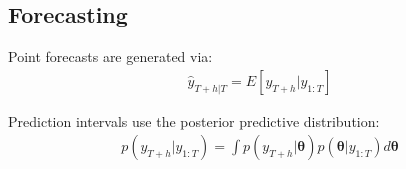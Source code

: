\subsection{Forecasting}

Point forecasts are generated via:
\begin{align}
    \hat{y}_{T+h|T} = E[y_{T+h} | y_{1:T}]
\end{align}

Prediction intervals use the posterior predictive distribution:
\begin{align}
    p(y_{T+h} | y_{1:T}) = \int p(y_{T+h} | \boldsymbol{\theta}) p(\boldsymbol{\theta} | y_{1:T}) d\boldsymbol{\theta}
\end{align}
